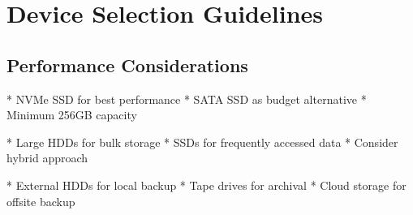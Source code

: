 \documentclass[letterpaper,10pt,english]{sphinxmanual}
\begin{document}
\section{Device Selection Guidelines}
\label{\detokenize{storage-devices:device-selection-guidelines}}

\subsection{Performance Considerations}
\label{\detokenize{storage-devices:performance-considerations}}
\sphinxAtStartPar
{}
* NVMe SSD for best performance
* SATA SSD as budget alternative
* Minimum 256GB capacity

\sphinxAtStartPar
{}
* Large HDDs for bulk storage
* SSDs for frequently accessed data
* Consider hybrid approach

\sphinxAtStartPar
{}
* External HDDs for local backup
* Tape drives for archival
* Cloud storage for offsite backup
\end{document}

